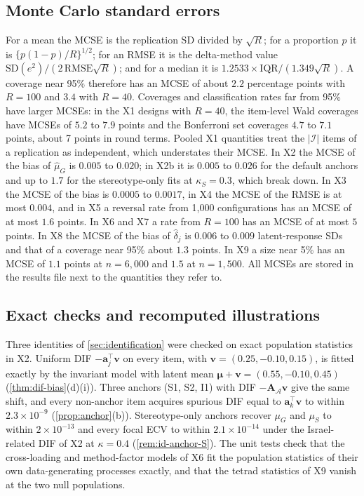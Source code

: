 \subsection{Monte Carlo standard errors}\label{app:sim-mcse}

For a mean the MCSE is the replication SD divided by $\sqrt R$; for a proportion $p$ it is $\{p(1-p)/R\}^{1/2}$; for an RMSE it is the delta-method value $\mathrm{SD}(e^2)/(2\,\mathrm{RMSE}\sqrt R)$; and for a median it is $1.2533\times\mathrm{IQR}/(1.349\sqrt R)$. A coverage near 95\% therefore has an MCSE of about $2.2$ percentage points with $R=100$ and $3.4$ with $R=40$. Coverages and classification rates far from 95\% have larger MCSEs: in the X1 designs with $R=40$, the item-level Wald coverages have MCSEs of $5.2$ to $7.9$ points and the Bonferroni set coverages $4.7$ to $7.1$ points, about 7 points in round terms. Pooled X1 quantities treat the $|\mathcal I|$ items of a replication as independent, which understates their MCSE. In X2 the MCSE of the bias of $\hat\mu_G$ is $0.005$ to $0.020$; in X2b it is $0.005$ to $0.026$ for the default anchors and up to $1.7$ for the stereotype-only fits at $\kappa_S=0.3$, which break down. In X3 the MCSE of the bias is $0.0005$ to $0.0017$, in X4 the MCSE of the RMSE is at most $0.004$, and in X5 a reversal rate from 1{,}000 configurations has an MCSE of at most $1.6$ points. In X6 and X7 a rate from $R=100$ has an MCSE of at most $5$ points. In X8 the MCSE of the bias of $\hat\delta_j$ is $0.006$ to $0.009$ latent-response SDs and that of a coverage near 95\% about $1.3$ points. In X9 a size near 5\% has an MCSE of $1.1$ points at $n=6{,}000$ and $1.5$ at $n=1{,}500$. All MCSEs are stored in the results file next to the quantities they refer to.

\subsection{Exact checks and recomputed illustrations}\label{app:sim-checks}

Three identities of \cref{sec:identification} were checked on exact population statistics in X2. Uniform DIF $-\bm a_j^\top\bm v$ on every item, with $\bm v=(0.25,-0.10,0.15)$, is fitted exactly by the invariant model with latent mean $\bm\mu+\bm v=(0.55,-0.10,0.45)$ (\cref{thm:dif-bias}(d)(i)). Three anchors (S1, S2, I1) with DIF $-\bm A_{\mathcal A}\bm v$ give the same shift, and every non-anchor item acquires spurious DIF equal to $\bm a_k^\top\bm v$ to within $2.3\times10^{-9}$ (\cref{prop:anchor}(b)). Stereotype-only anchors recover $\mu_G$ and $\mu_S$ to within $2\times10^{-13}$ and every focal ECV to within $2.1\times10^{-14}$ under the Israel-related DIF of X2 at $\kappa=0.4$ (\cref{rem:id-anchor-S}). The unit tests check that the cross-loading and method-factor models of X6 fit the population statistics of their own data-generating processes exactly, and that the tetrad statistics of X9 vanish at the two null populations.

